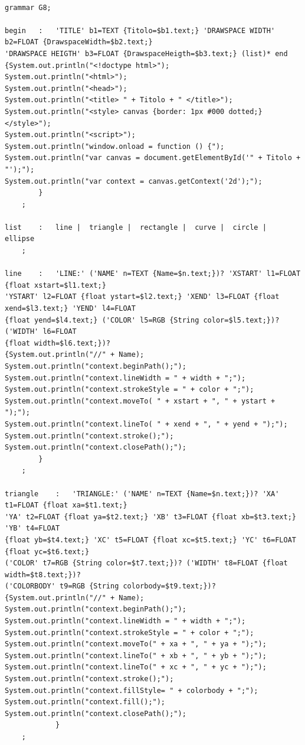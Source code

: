 \documentclass[a4paper]{article}
\begin{document}
\begin{verbatim}

grammar G8;

begin	:	'TITLE' b1=TEXT {Titolo=$b1.text;} 'DRAWSPACE WIDTH' b2=FLOAT {DrawspaceWidth=$b2.text;} 
'DRAWSPACE HEIGTH' b3=FLOAT {DrawspaceHeigth=$b3.text;} (list)* end
{System.out.println("<!doctype html>");
System.out.println("<html>");
System.out.println("<head>");
System.out.println("<title> " + Titolo + " </title>");
System.out.println("<style> canvas {border: 1px #000 dotted;} </style>");
System.out.println("<script>");
System.out.println("window.onload = function () {");
System.out.println("var canvas = document.getElementById('" + Titolo + "');");
System.out.println("var context = canvas.getContext('2d');");
		}
	; 
	
list	:	line |  triangle |  rectangle |  curve |  circle |  ellipse
	;

line 	:	'LINE:' ('NAME' n=TEXT {Name=$n.text;})? 'XSTART' l1=FLOAT {float xstart=$l1.text;} 
'YSTART' l2=FLOAT {float ystart=$l2.text;} 'XEND' l3=FLOAT {float xend=$l3.text;} 'YEND' l4=FLOAT 
{float yend=$l4.text;} ('COLOR' l5=RGB {String color=$l5.text;})? ('WIDTH' l6=FLOAT 
{float width=$l6.text;})? 
{System.out.println("//" + Name);
System.out.println("context.beginPath();");
System.out.println("context.lineWidth = " + width + ";");
System.out.println("context.strokeStyle = " + color + ";");
System.out.println("context.moveTo( " + xstart + ", " + ystart + ");");
System.out.println("context.lineTo( " + xend + ", " + yend + ");");
System.out.println("context.stroke();");
System.out.println("context.closePath();");
		}
	;

triangle 	:	'TRIANGLE:' ('NAME' n=TEXT {Name=$n.text;})? 'XA' t1=FLOAT {float xa=$t1.text;} 
'YA' t2=FLOAT {float ya=$t2.text;} 'XB' t3=FLOAT {float xb=$t3.text;} 'YB' t4=FLOAT 
{float yb=$t4.text;} 'XC' t5=FLOAT {float xc=$t5.text;} 'YC' t6=FLOAT {float yc=$t6.text;} 
('COLOR' t7=RGB {String color=$t7.text;})? ('WIDTH' t8=FLOAT {float width=$t8.text;})? 
('COLORBODY' t9=RGB {String colorbody=$t9.text;})?
{System.out.println("//" + Name);
System.out.println("context.beginPath();");
System.out.println("context.lineWidth = " + width + ";");
System.out.println("context.strokeStyle = " + color + ";");
System.out.println("context.moveTo(" + xa + ", " + ya + ");");
System.out.println("context.lineTo(" + xb + ", " + yb + ");");
System.out.println("context.lineTo(" + xc + ", " + yc + ");");
System.out.println("context.stroke();");
System.out.println("context.fillStyle= " + colorbody + ";");
System.out.println("context.fill();");
System.out.println("context.closePath();");
			}
	;


\end{verbatim}
\end{document}
